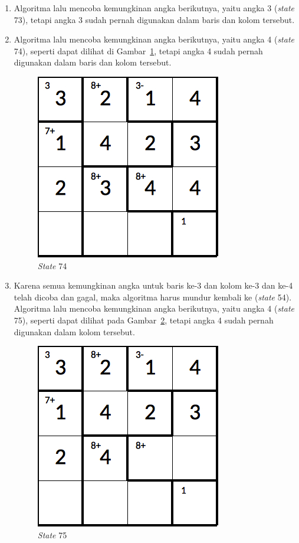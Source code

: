 \begin{enumerate}
\item Algoritma lalu mencoba kemungkinan angka berikutnya, yaitu angka 3 (\textit{state} 73), tetapi angka 3 sudah pernah digunakan dalam baris dan kolom tersebut.
\item Algoritma lalu mencoba kemungkinan angka berikutnya, yaitu angka 4 (\textit{state} 74), seperti dapat dilihat di Gambar~\ref{fig:analisisbt22}, tetapi angka 4 sudah pernah digunakan dalam baris dan kolom tersebut.

\begin{figure}
\centering
\captionsetup{justification=centering}
\includegraphics[scale=0.333]{Gambar/backtracking/State74}
\caption[\textit{State} 74]{\textit{State} 74}
\label{fig:analisisbt22}
\end{figure}

\item Karena semua kemungkinan angka untuk baris ke-3 dan kolom ke-3 dan ke-4 telah dicoba dan gagal, maka algoritma harus mundur kembali ke (\textit{state} 54). Algoritma lalu mencoba kemungkinan angka berikutnya, yaitu angka 4 (\textit{state} 75), seperti dapat dilihat pada Gambar~\ref{fig:analisisbt23}, tetapi angka 4 sudah pernah digunakan dalam kolom tersebut.

\begin{figure}
\centering
\captionsetup{justification=centering}
\includegraphics[scale=0.333]{Gambar/backtracking/State75}
\caption[\textit{State} 75]{\textit{State} 75}
\label{fig:analisisbt23}
\end{figure}


\end{enumerate}
